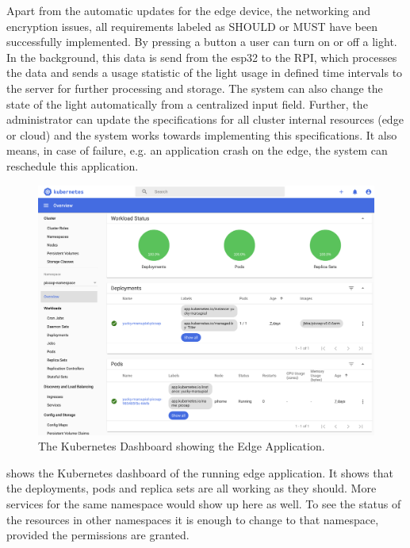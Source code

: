 Apart from the automatic updates for the edge device, the networking and encryption issues, all requirements labeled as SHOULD or MUST have been successfully implemented. By pressing a button a user can turn on or off a light. In the background, this data is send from the esp32 to the RPI, which processes the data and sends a usage statistic of the light usage in defined time intervals to the server for further processing and storage. The system can also change the state of the light automatically from a centralized input field. Further, the administrator can update the specifications for all cluster internal resources (edge or cloud) and the system works towards implementing this specifications. It also means, in case of failure, e.g. an application crash on the edge, the system can reschedule this application. 

\begin{figure}[!ht]
    \centering
    \includegraphics[width=\textwidth]{figures/dashboardK8s.png}
    \caption{The Kubernetes Dashboard showing the Edge Application.}
    \label{fig:dashboarK8s}
\end{figure}

 shows the Kubernetes dashboard of the running edge application. It shows that the deployments, pods and replica sets are all working as they should. More services for the same namespace would show up here as well. To see the status of the resources in other namespaces it is enough to change to that namespace, provided the permissions are granted.

